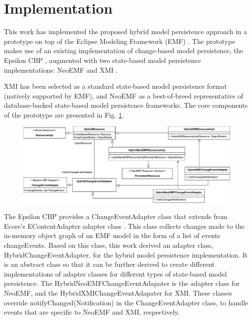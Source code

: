\section{Implementation}
\label{sec:implementation}
This work has implemented the proposed hybrid model persistence approach in a prototype \cite{epsilonlabs2019emfcbp} on top of the Eclipse Modeling Framework (EMF) \cite{steinberg2008emf}. The prototype makes use of an existing implementation of change-based model persistence, the Epsilon CBP \cite{DBLP:conf/models/YohannisKP17}, augmented with two state-based model persistence implementations: NeoEMF \cite{daniel2016neoemf} and XMI \cite{omg2018xmi}.

XMI has been selected as a standard state-based model persistence format (natively supported by EMF), and NeoEMF as a best-of-breed representative of database-backed state-based model persistence frameworks. The core components of the prototype are presented in Fig. \ref{fig:class_diagram}. 

\begin{figure}[ht]
    \includegraphics[width=\linewidth]{images/class_diagram}
    \label{fig:class_diagram}
\end{figure}

The Epsilon CBP provides a \textsf{ChangeEventAdapter} class \cite{DBLP:conf/models/YohannisKP17} that extends from Ecore's \textsf{EContentAdapter} adapter class \cite{eclipse2018eContentAdapter}
. This class collects changes made to the in-memory object graph of an EMF model in the form of a list of events \textsf{changeEvents}. Based on this class, this work derived an adapter class, \textsf{HybridChangeEventAdapter}, for the hybrid model persistence implementation. It is an abstract class so that it can be further derived to create different implementations of adapter classes for different types of state-based model persistence. The \textsf{HybridNeoEMFChangeEventAdapater} is the adapter class for NeoEMF, and the \textsf{HybridXMIChangeEventAdapater} for XMI. These classes override \textsf{notifyChanged}(\textsf{Notification}) in the \textsf{ChangeEventAdapter} class, to handle events that are specific to NeoEMF and XMI, respectively.

